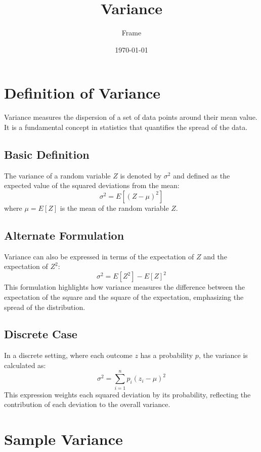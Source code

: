 \documentclass{article}
\begin{document}
\title{Variance}
\author{Frame}
\date{\today}
\maketitle

\section{Definition of Variance}

Variance measures the dispersion of a set of data points around their mean value. It is a fundamental concept in statistics that quantifies the spread of the data.

\subsection{Basic Definition}

The variance of a random variable \( Z \) is denoted by \( \sigma^2 \) and defined as the expected value of the squared deviations from the mean:
\[
\sigma^2 = E[(Z - \mu)^2]
\]
where \( \mu = E[Z] \) is the mean of the random variable \( Z \).

\subsection{Alternate Formulation}

Variance can also be expressed in terms of the expectation of \( Z \) and the expectation of \( Z^2 \):
\[
\sigma^2 = E[Z^2] - E[Z]^2
\]
This formulation highlights how variance measures the difference between the expectation of the square and the square of the expectation, emphasizing the spread of the distribution.

\subsection{Discrete Case}

In a discrete setting, where each outcome \( z \) has a probability \( p \), the variance is calculated as:
\[
\sigma^2 = \sum_{i=1}^n p_i (z_i - \mu)^2
\]
This expression weights each squared deviation by its probability, reflecting the contribution of each deviation to the overall variance.

\section{Sample Variance}
\end{document}
